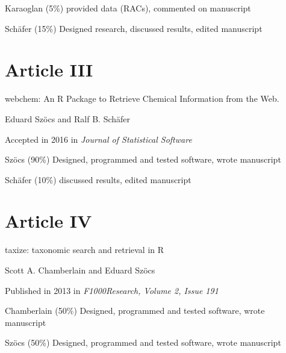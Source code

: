 \begin{sloppypar}
\begin{description}
	Karaoglan (5\%) provided data (RACs), commented on manuscript

	Schäfer (15\%) Designed research, discussed results, edited manuscript
\end{description}
\normalsize

\vspace{-1em}
\section*{Article III}
\vspace{-1em}
\small
\begin{description}
    \setlength\itemsep{0em}
	\item[Title:] webchem: An R Package to Retrieve Chemical Information from the Web.
	\item[Authors:] Eduard Szöcs and Ralf B. Schäfer
	\item[Status:] Accepted in 2016 in \emph{Journal of Statistical Software}
	\item[Contributions:] Szöcs (90\%) Designed, programmed and tested software, wrote manuscript

	Schäfer (10\%) discussed results, edited manuscript
\end{description}
\normalsize

\vspace{-1em}
\section*{Article IV}
\vspace{-1em}
\small
\begin{description}
    \setlength\itemsep{0em}
	\item[Title:] taxize: taxonomic search and retrieval in R
	\item[Authors:] Scott A. Chamberlain and Eduard Szöcs
	\item[Status:] Published in 2013 in \emph{F1000Research, Volume 2, Issue 191}
	\item[Contributions:] Chamberlain (50\%) Designed, programmed and tested software, wrote manuscript

	Szöcs (50\%) Designed, programmed and tested software, wrote manuscript
\end{description}
\end{sloppypar}


\restoregeometry

